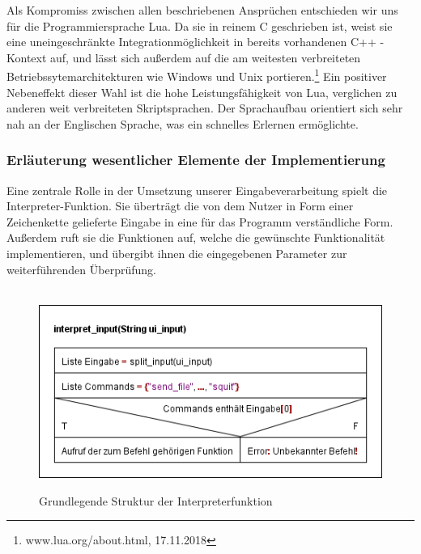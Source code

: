 Als Kompromiss zwischen allen beschriebenen Ansprüchen entschieden wir uns für die Programmiersprache Lua. Da sie in reinem C geschrieben ist, weist sie eine uneingeschränkte Integrationmöglichkeit in bereits vorhandenen C++ - Kontext auf, und lässt sich außerdem auf die am weitesten verbreiteten Betriebssytemarchitekturen wie Windows und Unix portieren.\footnote{www.lua.org/about.html, 17.11.2018} Ein positiver Nebeneffekt dieser Wahl ist die hohe Leistungsfähigkeit von Lua, verglichen zu anderen weit verbreiteten Skriptsprachen. Der Sprachaufbau orientiert sich sehr nah an der Englischen Sprache, was ein schnelles Erlernen ermöglichte.


\subsubsection{Erläuterung wesentlicher Elemente der Implementierung}
Eine zentrale Rolle in der Umsetzung unserer Eingabeverarbeitung spielt die Interpreter-Funktion. Sie überträgt die von dem Nutzer in Form einer Zeichenkette gelieferte Eingabe in eine für das Programm verständliche Form. Außerdem ruft sie die Funktionen auf, welche die gewünschte Funktionalität implementieren, und übergibt ihnen die eingegebenen Parameter zur weiterführenden Überprüfung.\\\hfill\\
\begin{figure}[h!]
\centering
\includegraphics[scale=0.75]{templ}\\
\caption{Grundlegende Struktur der Interpreterfunktion}
\label{intp}
\end{figure}



